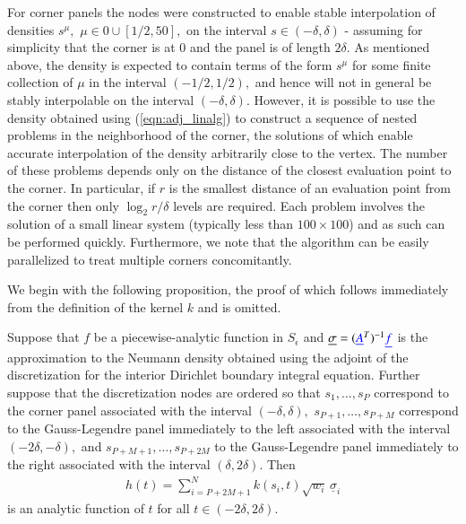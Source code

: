 For corner panels the nodes were constructed to enable stable interpolation of densities $s^\mu,$ $\mu \in 0 \cup [1/2,50],$ on the interval $s \in (-\delta,\delta)$ - assuming for simplicity that the corner is at $0$ and the panel is of length $2 \delta.$ As mentioned above, the density is expected to contain terms of the form $s^\mu$ for some finite collection of $\mu$ in the interval $(-1/2,1/2),$ and hence will not in general be stably interpolable on the interval $(-\delta,\delta).$ However, it is possible to use the density obtained using (\ref{eqn:adj_linalg}) to construct a sequence of nested problems in the neighborhood of the corner, the solutions of which enable accurate interpolation of the density arbitrarily close to the vertex. The number of these problems depends only on the distance of the closest evaluation point to the corner. In particular, if $r$ is the smallest distance of an evaluation point from the corner then only $\log_2 r/\delta$ levels are required. Each problem involves the solution of a small linear system (typically less than $100 \times 100$) and as such can be performed quickly. Furthermore, we note that the algorithm can be easily parallelized to treat multiple corners concomitantly.

We begin with the following proposition, the proof of which follows immediately from the definition of the kernel $k$ and is omitted.
\begin{proposition}
Suppose that $f$ be a piecewise-analytic function in $S_\epsilon$ and  $\underline{\sigma} = ({\color{blue} \underline{A}}^T)^{-1} {\color{blue} \underline{f}}$ is the approximation to the Neumann density obtained using the adjoint of the discretization for the interior Dirichlet boundary integral equation. Further suppose that the discretization nodes are ordered so that $s_1,\dots,s_P$ correspond to the corner panel associated with the interval $(-\delta,\delta),$ $s_{P+1},\dots,s_{P+M}$ correspond to the Gauss-Legendre panel immediately to the left associated with the interval $(-2\delta,-\delta),$ and $s_{P+M+1},\dots,s_{P+2M}$ to the Gauss-Legendre panel immediately to the right associated with the interval $(\delta,2\delta).$
Then
\begin{align}
h(t) = \sum_{i=P+2M+1}^N k(s_i,t) \sqrt{w_i} \,\underline{\sigma}_i
\end{align}
is an analytic function of $t$ for all $t \in (-2\delta,2\delta).$
\end{proposition}

